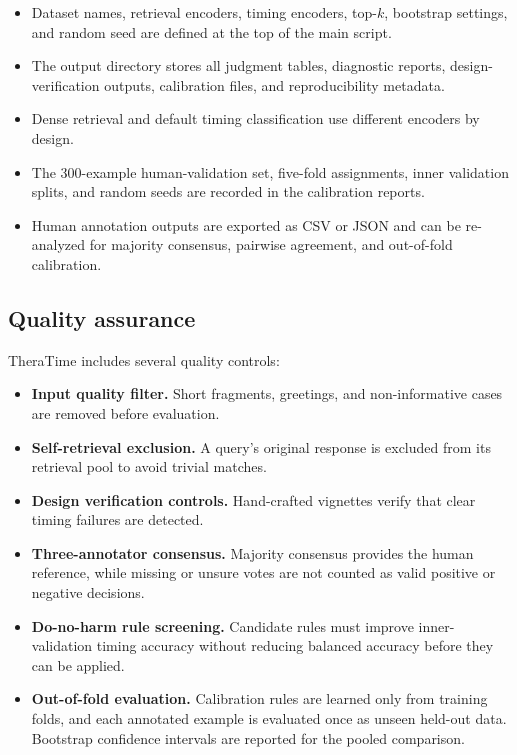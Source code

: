 \documentclass[preprint,12pt,a4paper]{elsarticle}
\begin{document}
\begin{itemize}
    \item Dataset names, retrieval encoders, timing encoders, top-\(k\), bootstrap settings, and random seed are defined at the top of the main script.
    \item The output directory stores all judgment tables, diagnostic reports, design-verification outputs, calibration files, and reproducibility metadata.
    \item Dense retrieval and default timing classification use different encoders by design.
    \item The 300-example human-validation set, five-fold assignments, inner validation splits, and random seeds are recorded in the calibration reports.
    \item Human annotation outputs are exported as CSV or JSON and can be re-analyzed for majority consensus, pairwise agreement, and out-of-fold calibration.
\end{itemize}

\subsection{Quality assurance}

TheraTime includes several quality controls:

\begin{itemize}
    \item \textbf{Input quality filter.} Short fragments, greetings, and non-informative cases are removed before evaluation.
    \item \textbf{Self-retrieval exclusion.} A query's original response is excluded from its retrieval pool to avoid trivial matches.
    \item \textbf{Design verification controls.} Hand-crafted vignettes verify that clear timing failures are detected.
    \item \textbf{Three-annotator consensus.} Majority consensus provides the human reference, while missing or unsure votes are not counted as valid positive or negative decisions.
    \item \textbf{Do-no-harm rule screening.} Candidate rules must improve inner-validation timing accuracy without reducing balanced accuracy before they can be applied.
    \item \textbf{Out-of-fold evaluation.} Calibration rules are learned only from training folds, and each annotated example is evaluated once as unseen held-out data. Bootstrap confidence intervals are reported for the pooled comparison.
\end{itemize}
\end{document}
